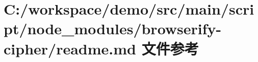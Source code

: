 \hypertarget{node__modules_2browserify-cipher_2_r_e_a_d_m_e_8md}{}\section{C\+:/workspace/demo/src/main/script/node\+\_\+modules/browserify-\/cipher/readme.md 文件参考}
\label{node__modules_2browserify-cipher_2_r_e_a_d_m_e_8md}
